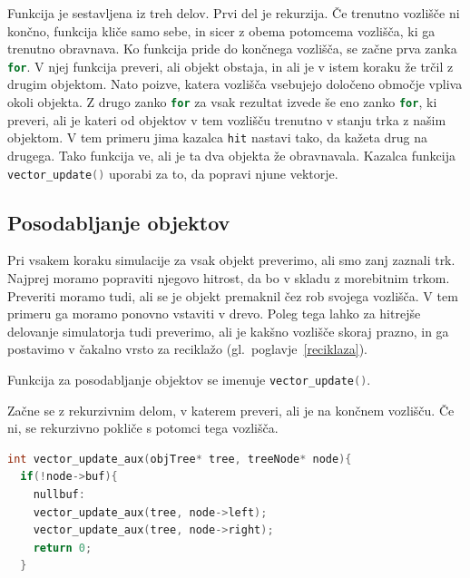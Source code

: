 \documentclass[a4paper,12pt]{article}
\begin{document}
Funkcija je sestavljena iz treh delov. Prvi del je rekurzija. Če trenutno vozlišče ni končno, funkcija kliče samo sebe, in sicer 
z obema potomcema vozlišča, ki ga trenutno obravnava. Ko funkcija pride do končnega vozlišča, se začne
prva zanka \lstinline[language=C]{for}. V njej funkcija preveri, ali objekt obstaja, in ali je v istem koraku
že trčil z drugim objektom. Nato poizve, katera vozlišča vsebujejo določeno območje vpliva okoli objekta.
Z drugo zanko \lstinline[language=C]{for} za vsak rezultat izvede še eno zanko \lstinline[language=C]{for},
ki preveri, ali je kateri od objektov v tem vozlišču trenutno v stanju trka z našim objektom. V tem primeru
jima kazalca \lstinline[language=C]{hit} nastavi tako, da kažeta drug na drugega. Tako funkcija ve,
ali je ta dva objekta že obravnavala. Kazalca funkcija \lstinline[language=C]{vector_update()} uporabi za to, da
popravi njune vektorje. 
\subsection{Posodabljanje objektov}
Pri vsakem koraku simulacije za vsak objekt preverimo, ali smo zanj zaznali trk.
Najprej moramo popraviti njegovo hitrost, da bo v skladu z morebitnim trkom. Preveriti moramo tudi,
ali se je objekt premaknil čez rob svojega vozlišča. V tem primeru ga moramo ponovno vstaviti v drevo.
Poleg tega lahko za hitrejše delovanje simulatorja tudi preverimo, ali je kakšno vozlišče skoraj prazno, in ga postavimo
v čakalno vrsto za reciklažo (gl.\ poglavje~\ref{reciklaza}).

Funkcija za posodabljanje objektov se imenuje \lstinline[language=C]{vector_update()}.

Začne se z rekurzivnim delom, v katerem preveri, ali je na končnem vozlišču. Če ni, se rekurzivno pokliče
s potomci tega vozlišča.

\begin{lstlisting}[caption={\lstinline|vector_update()| -- Rekurzivni del}, label=vectorupdate1, language=C]
int vector_update_aux(objTree* tree, treeNode* node){
  if(!node->buf){
    nullbuf:
    vector_update_aux(tree, node->left);
    vector_update_aux(tree, node->right);
    return 0;
  }
\end{lstlisting}
\end{document}
